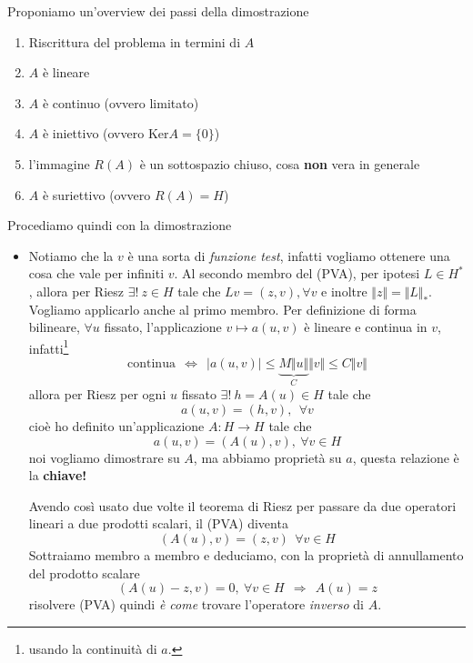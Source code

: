 \documentclass[10pt,a4paper,twoside,openright]{book}
\begin{document}
\begin{dimostrazione}
	Proponiamo un'overview dei passi della dimostrazione
	\begin{enumerate}
		\item[(0)] Riscrittura del problema in termini di $A$
		\item[(1)] $A$ è lineare
		\item[(2)] $A$ è continuo (ovvero limitato)
		\item[(3)] $A$ è iniettivo (ovvero $\mathrm{Ker} A=\{0\}$)
		\item[(3.5)] l'immagine $R(A)$ è un sottospazio chiuso, cosa \textbf{non} vera in generale
		\item[(4)] $A$ è suriettivo (ovvero $R(A) =H$)
	\end{enumerate}
	Procediamo quindi con la dimostrazione
	\begin{itemize}
		\item[(0)]

		Notiamo che la $v$ è una sorta di \textit{funzione test}, infatti vogliamo ottenere una cosa che vale per infiniti $v$. Al secondo membro del (PVA), per ipotesi $L\in H^{*}$, allora per Riesz $\exists !\ z\in H$ tale che $Lv=(z,v),\forall v$ e inoltre $\Vert z\Vert =\Vert L\Vert _{*}$. Vogliamo applicarlo anche al primo membro. Per definizione di forma bilineare, $\forall u$ fissato, l'applicazione $v\mapsto a(u,v)$ è lineare e continua in $v$, infatti\footnote{usando la continuità di $a$.}
		\begin{equation*}
			\text{continua} \ \ \Leftrightarrow \ \ | a(u,v)| \leqslant \underbrace{M\Vert u\Vert }_{C}\Vert v\Vert \leqslant C\Vert v\Vert 
		\end{equation*}
		allora per Riesz per ogni $u$ fissato $\exists !\ h=A(u) \in H$ tale che
		\begin{equation*}
			a(u,v) =(h,v),\ \ \forall v
		\end{equation*}
		cioè ho definito un'applicazione $A:H\rightarrow H$ tale che
		\begin{equation*}
			\boxed{a(u,v) =(A(u),v),\ \forall v\in H}
		\end{equation*}
		noi vogliamo dimostrare su $A$, ma abbiamo proprietà su $a$, questa relazione è la \textbf{chiave!}

		Avendo così usato due volte il teorema di Riesz per passare da due operatori lineari a due prodotti scalari, il (PVA) diventa
		\begin{equation*}
			(A(u),v) =(z,v) \ \ \forall v\in H
		\end{equation*}
		Sottraiamo membro a membro e deduciamo, con la proprietà di annullamento del prodotto scalare
		\begin{equation*}
			(A(u) -z,v) =0,\ \forall v\in H\ \ \Rightarrow \ \ \boxed{A(u) =z}
		\end{equation*}
		risolvere (PVA) quindi \textit{è come} trovare l'operatore \textit{inverso} di $A$.




\end{itemize}
\end{dimostrazione}
\end{document}
